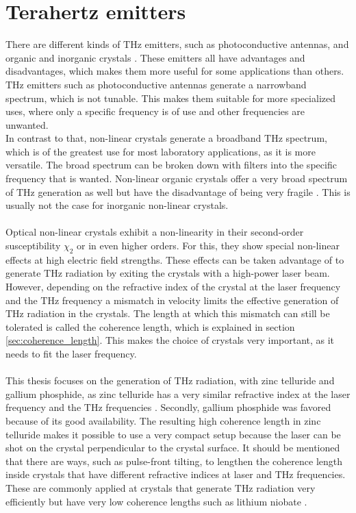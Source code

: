 \section{Terahertz emitters}
\label{sec:emitters}
There are different kinds of $\si{\tera\hertz}$ emitters, such as photoconductive antennas, and organic and inorganic crystals \cite{Tutorial}.
These emitters all have advantages and disadvantages, which makes them more useful for some applications than others.
$\si{\tera\hertz}$ emitters such as photoconductive antennas generate a narrowband spectrum, which is not tunable.
This makes them suitable for more specialized uses, where only a specific frequency is of use and other frequencies are unwanted.
\\
In contrast to that, non-linear crystals generate a broadband $\si{\tera\hertz}$ spectrum, which is of the greatest use for most laboratory applications, as it is more versatile.
The broad spectrum can be broken down with filters into the specific frequency that is wanted.
Non-linear organic crystals offer a very broad spectrum of $\si{\tera\hertz}$ generation as well but have the disadvantage of being very fragile \cite{organic_crystals}.
This is usually not the case for inorganic non-linear crystals.
\\\\
Optical non-linear crystals exhibit a non-linearity in their second-order susceptibility $\chi_2$ or in even higher orders.
For this, they show special non-linear effects at high electric field strengths.
These effects can be taken advantage of to generate $\si{\tera\hertz}$ radiation by exiting the crystals with a high-power laser beam.
\\
However, depending on the refractive index of the crystal at the laser frequency and the $\si{\tera\hertz}$ frequency a mismatch in velocity limits the effective generation of $\si{\tera\hertz}$ radiation in the crystals.
The length at which this mismatch can still be tolerated is called the coherence length, which is explained in section \ref{sec:coherence_length}.
This makes the choice of crystals very important, as it needs to fit the laser frequency.
\\\\
This thesis focuses on the generation of $\si{\tera\hertz}$ radiation, with zinc telluride and gallium phosphide, as zinc telluride has a very similar refractive index at the laser frequency and the $\si{\tera\hertz}$ frequencies \cite{coherence_legnth}.
Secondly, gallium phosphide was favored because of its good availability.
The resulting high coherence length in zinc telluride makes it possible to use a very compact setup because the laser can be shot on the crystal perpendicular to the crystal surface.
It should be mentioned that there are ways, such as pulse-front tilting, to lengthen the coherence length inside crystals that have different refractive indices at laser and $\si{\tera\hertz}$ frequencies.
These are commonly applied at crystals that generate $\si{\tera\hertz}$ radiation very efficiently but have very low coherence lengths such as lithium niobate \cite{pulsefront_tilting}.
